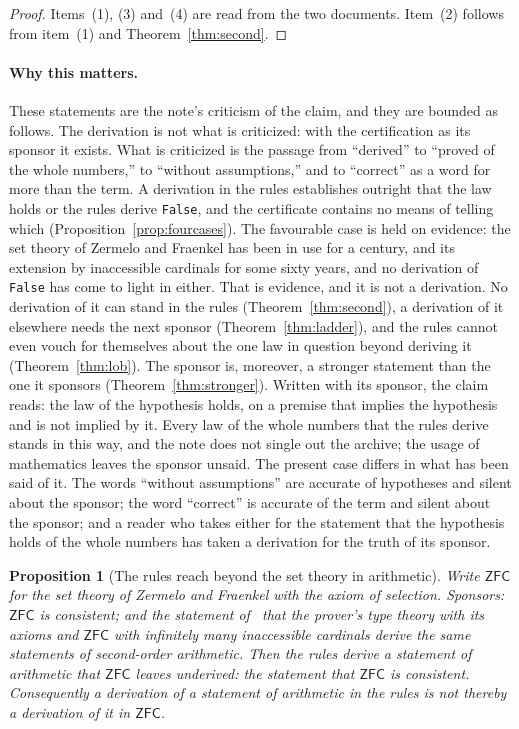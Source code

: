 \documentclass[11pt]{article}
\newtheorem{proposition}[theorem]{Proposition}
\theoremstyle{definition}
\theoremstyle{remark}
\DeclareRobustCommand{\lean}[1]{{\renewcommand{\_}{\textunderscore\allowbreak}\texttt{#1}}}
\newcommand{\False}{\lean{False}}
\begin{document}
\begin{proof}
Items~(1), (3) and~(4) are read from the two documents. Item~(2) follows from item~(1) and Theorem~\ref{thm:second}.
\end{proof}

\paragraph{Why this matters.} These statements are the note's criticism of the claim, and they are bounded as follows. The derivation is not what is criticized: with the certification as its sponsor it exists. What is criticized is the passage from ``derived'' to ``proved of the whole numbers,'' to ``without assumptions,'' and to ``correct'' as a word for more than the term. A derivation in the rules establishes outright that the law holds or the rules derive \False, and the certificate contains no means of telling which (Proposition~\ref{prop:fourcases}). The favourable case is held on evidence: the set theory of Zermelo and Fraenkel has been in use for a century, and its extension by inaccessible cardinals for some sixty years, and no derivation of \False{} has come to light in either. That is evidence, and it is not a derivation. No derivation of it can stand in the rules (Theorem~\ref{thm:second}), a derivation of it elsewhere needs the next sponsor (Theorem~\ref{thm:ladder}), and the rules cannot even vouch for themselves about the one law in question beyond deriving it (Theorem~\ref{thm:lob}). The sponsor is, moreover, a stronger statement than the one it sponsors (Theorem~\ref{thm:stronger}). Written with its sponsor, the claim reads: the law of the hypothesis holds, on a premise that implies the hypothesis and is not implied by it. Every law of the whole numbers that the rules derive stands in this way, and the note does not single out the archive; the usage of mathematics leaves the sponsor unsaid. The present case differs in what has been said of it. The words ``without assumptions'' are accurate of hypotheses and silent about the sponsor; the word ``correct'' is accurate of the term and silent about the sponsor; and a reader who takes either for the statement that the hypothesis holds of the whole numbers has taken a derivation for the truth of its sponsor.

\begin{proposition}[The rules reach beyond the set theory in arithmetic]\label{prop:beyond}
Write $\mathsf{ZFC}$ for the set theory of Zermelo and Fraenkel with the axiom of selection. Sponsors: $\mathsf{ZFC}$ is consistent; and the statement of~\citet{bresolinmamino} that the prover's type theory with its axioms and $\mathsf{ZFC}$ with infinitely many inaccessible cardinals derive the same statements of second-order arithmetic. Then the rules derive a statement of arithmetic that $\mathsf{ZFC}$ leaves underived: the statement that $\mathsf{ZFC}$ is consistent. Consequently a derivation of a statement of arithmetic in the rules is not thereby a derivation of it in $\mathsf{ZFC}$.
\end{proposition}
\end{document}
